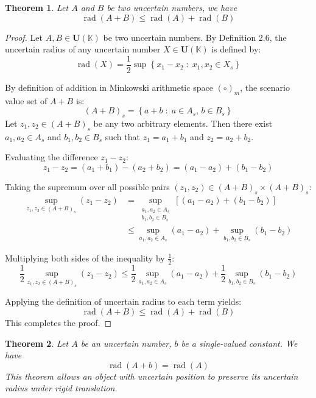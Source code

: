 \documentclass[a4paper,12pt, twoside]{memoir}
\newtheorem{theorem}{Theorem}[chapter]
\DeclareMathOperator{\rad}{rad}
\newcommand{\set}[1]{\left\{#1\right\}} %
\newcommand{\tsbd}[1]{\mathbf{U}(\mathbb{#1})}
\begin{document}
\begin{theorem}
	Let $A$ and $B$ be two uncertain numbers, we have
	$$\rad(A+B) \leq \rad(A) +\rad(B)$$
\end{theorem}
\begin{proof}
	Let $A, B \in \tsbd{K}$ be two uncertain numbers. By Definition 2.6, the uncertain radius of any uncertain number $X \in \tsbd{K}$ is defined by:
	\[
		\rad(X) = \frac{1}{2} \sup \set{x_1 - x_2 \;:\; x_1, x_2 \in X_s}
	\]

	By definition of addition in Minkowski arithmetic space $(\circ)_m$, the scenario value set of $A + B$ is:
	\[
		(A + B)_s = \set{a + b \;:\; a \in A_s, \, b \in B_s}
	\]
	Let $z_1, z_2 \in (A + B)_s$ be any two arbitrary elements. Then there exist $a_1, a_2 \in A_s$ and $b_1, b_2 \in B_s$ such that $z_1 = a_1 + b_1$ and $z_2 = a_2 + b_2$.

	Evaluating the difference $z_1 - z_2$:
	\[
		z_1 - z_2 = (a_1 + b_1) - (a_2 + b_2) = (a_1 - a_2) + (b_1 - b_2)
	\]

	Taking the supremum over all possible pairs $(z_1, z_2) \in (A + B)_s \times (A + B)_s$:
	\begin{align*}
		\sup_{z_1, z_2 \in (A + B)_s} (z_1 - z_2) & = \sup_{\substack{a_1, a_2 \in A_s                                            \\ b_1, b_2 \in B_s}} \left[ (a_1 - a_2) + (b_1 - b_2) \right] \\
		                                          & \le \sup_{a_1, a_2 \in A_s} (a_1 - a_2) + \sup_{b_1, b_2 \in B_s} (b_1 - b_2)
	\end{align*}

	Multiplying both sides of the inequality by $\frac{1}{2}$:
	\[
		\frac{1}{2} \sup_{z_1, z_2 \in (A + B)_s} (z_1 - z_2) \le \frac{1}{2} \sup_{a_1, a_2 \in A_s} (a_1 - a_2) + \frac{1}{2} \sup_{b_1, b_2 \in B_s} (b_1 - b_2)
	\]

	Applying the definition of uncertain radius to each term yields:
	\[
		\rad(A + B) \le \rad(A) + \rad(B)
	\]
	This completes the proof.
\end{proof}
\begin{theorem}
	Let $A$ be an uncertain number, $b$ be a single-valued constant. We have
	$$\rad(A+b) = \rad(A)$$
	This theorem allows an object with uncertain position to preserve its uncertain radius under rigid translation.
\end{theorem}
\end{document}
